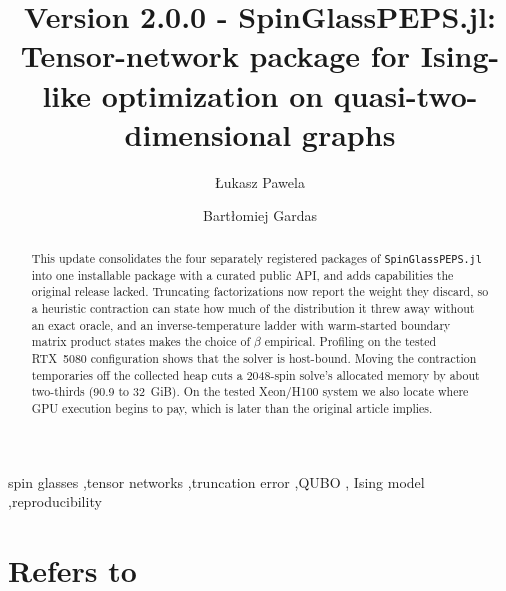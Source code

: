 \documentclass[preprint,12pt,a4paper]{elsarticle}
\begin{document}
\begin{frontmatter}

\title{Version 2.0.0 - SpinGlassPEPS.jl: Tensor-network package for
Ising-like optimization on quasi-two-dimensional graphs}

\author[iitis]{\L{}ukasz Pawela}
\author[iitis]{Bart\l{}omiej Gardas}


\address[iitis]{Institute of Theoretical and Applied Informatics, Polish Academy
of Sciences, Ba\l{}tycka 5, 44-100 Gliwice, Poland}

\begin{abstract}
This update consolidates the four separately registered packages of
\texttt{SpinGlassPEPS.jl} into one installable package with a curated public API,
and adds capabilities the original release lacked. Truncating factorizations now
report the weight they discard, so a heuristic contraction can state how much of
the distribution it threw away without an exact oracle, and an inverse-temperature
ladder with warm-started boundary matrix product states makes the choice of
$\beta$ empirical. Profiling on the tested RTX~5080 configuration shows that the
solver is host-bound. Moving the contraction temporaries off the collected heap
cuts a 2048-spin solve's allocated memory by about two-thirds (90.9 to 32~GiB). On
the tested Xeon/H100 system we also locate where GPU execution begins to pay, which
is later than the original article implies.
\end{abstract}

\begin{keyword}
spin glasses \sep tensor networks \sep truncation error \sep QUBO \sep
Ising model \sep reproducibility
\end{keyword}

\end{frontmatter}

\section*{Refers to}
\end{document}

